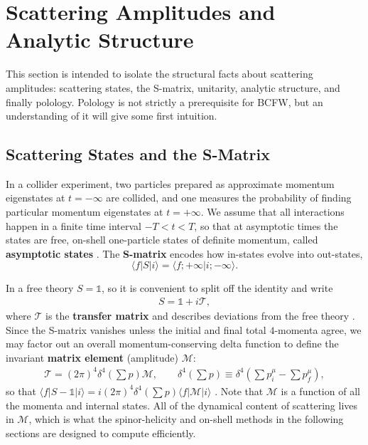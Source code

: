 \section{Scattering Amplitudes and Analytic Structure}
\label{sec:scattering-analytic-structure}

This section is intended to isolate the structural facts about scattering amplitudes: scattering states, the S-matrix, unitarity, analytic structure, and finally polology.
Polology is not strictly a prerequisite for BCFW, but an understanding of it will give some first intuition.

\subsection{Scattering States and the S-Matrix}
\label{subsec:scattering-states-and-the-s-matrix}

In a collider experiment, two particles prepared as approximate momentum eigenstates at $t = -\infty$ are collided, and one measures the probability of finding particular momentum eigenstates at $t = +\infty$. We assume that all interactions happen in a finite time interval $-T < t < T$, so that at asymptotic times the states are free, on-shell one-particle states of definite momentum, called \textbf{asymptotic states} \autocite[Chapter~6]{schwartzQFT2014}. The \textbf{S-matrix} encodes how in-states evolve into out-states,
\[
    \langle f | S | i \rangle = \langle f; +\infty | i; -\infty \rangle .
\]

In a free theory $S = \mathbb{1}$, so it is convenient to split off the identity and write
\begin{align}
    \label{eq:s-matrix-split}
    S = \mathbb{1} + i \mathcal{T},
\end{align}
where $\mathcal{T}$ is the \textbf{transfer matrix} and describes deviations from the free theory \autocite[(5.16)]{schwartzQFT2014}. Since the S-matrix vanishes unless the initial and final total $4$-momenta agree, we may factor out an overall momentum-conserving delta function to define the invariant \textbf{matrix element} (amplitude) $\mathcal{M}$:
\begin{align}
    \label{eq:t-matrix-amplitude}
    \mathcal{T} = (2\pi)^4 \delta^4\left(\textstyle\sum p\right) \mathcal{M},
    \qquad
    \delta^4\left(\textstyle\sum p\right) \equiv \delta^4\!\left(\textstyle\sum p_i^\mu - \sum p_f^\mu\right),
\end{align}
so that $\langle f | S - \mathbb{1} | i \rangle = i (2\pi)^4 \delta^4(\sum p) \langle f | \mathcal{M} | i \rangle$ \autocite[(5.17--5.18)]{schwartzQFT2014}. Note that $\mathcal{M}$ is a function of all the momenta and internal states. All of the dynamical content of scattering lives in $\mathcal{M}$, which is what the spinor-helicity and on-shell methods in the following sections are designed to compute efficiently.


